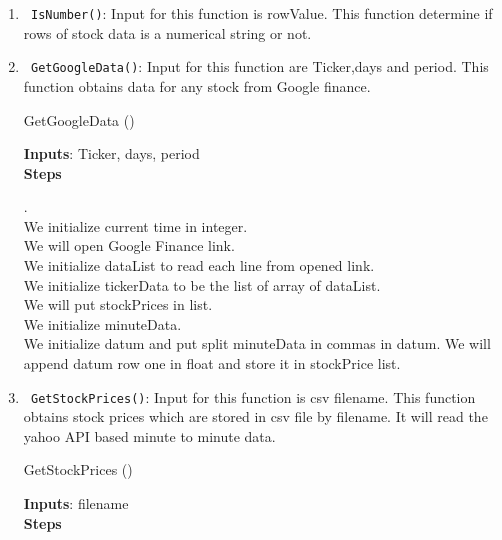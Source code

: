 \begin{enumerate}
  \item \verb! IsNumber()!: Input for this function is rowValue. This function determine if rows of stock data is a numerical string or not.
  \item \verb! GetGoogleData()!: Input for this function are Ticker,days and period. This function obtains data for any stock from Google
  finance.
  \begin{algorithm}
  \caption{GetGoogleData ()}
  \bigskip
  \textbf{Inputs}: Ticker, days, period\\
  \textbf{Steps}
  \begin{algorithmic}[1]
  .
  \Else 
  \EndIf\\
  We initialize current time in integer.\\
  We will open Google Finance link.\\
  We initialize dataList to read each line from opened link.\\
  We initialize tickerData to be the list of array of dataList.\\
  We will put stockPrices in list.\\
  We initialize  minuteData.\\
  \State We initialize datum and put split minuteData in commas in datum.
  \State We will append datum row one in float and store it in stockPrice list.\\
  \end{algorithmic}
  \end{algorithm}
  \item \verb! GetStockPrices()!: Input for this function is csv filename. This function obtains stock prices which are stored
  in csv file by filename. It will read the yahoo API based minute to minute data.
  \begin{algorithm}
  \caption{GetStockPrices ()}
  \bigskip
  \textbf{Inputs}: filename\\
  \textbf{Steps}
\end{algorithm}
\end{enumerate}

